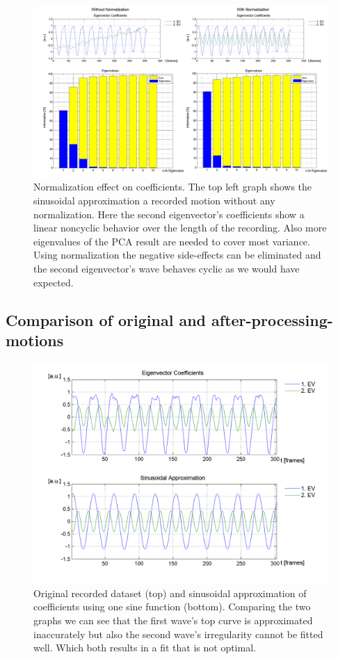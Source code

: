 \documentclass[a4paper]{article}
\begin{document}
\begin{figure}
	\centering
	\includegraphics[width=15cm]{sammel.png}
	\caption{Normalization effect on coefficients. The top left graph shows the sinusoidal approximation a recorded motion without any normalization. Here the second eigenvector's coefficients show a linear noncyclic behavior over the length of the recording.
	Also more eigenvalues of the PCA result are needed to cover most variance.
	Using normalization the negative side-effects can be eliminated and the second eigenvector's wave behaves cyclic as we would have expected.}
	\label{fig:sammel}
\end{figure}

\subsection{Comparison of original and after-processing-motions}

\begin{figure}
		\centering
		\includegraphics[width=\textwidth]{1sinHamp.png}
		\caption{Original recorded dataset (top) and sinusoidal approximation of coefficients using one sine function (bottom).
		Comparing the two graphs we can see that the first wave's top curve is approximated inaccurately but also the second wave's irregularity cannot be fitted well.
		Which both results in a fit that is not optimal.}
		\label{fig:orig_pca}
\end{figure}
\end{document}

